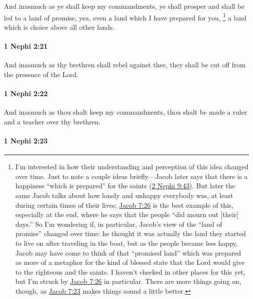 			And inasmuch as ye shall keep my commandments,
			ye shall prosper and shall be led to a land of promise,
			yea, even a land which I have prepared for you,%
				\footnote{%
					I'm interested in how their understanding and perception of this idea changed over time. Just to note a couple ideas briefly---Jacob later says that there is a happiness ``which is prepared'' for the saints (\hyperref[2NEPHI-9-43]{2 Nephi 9:43}). But later the same Jacob talks about how lonely and unhappy everybody was, at least during certain times of their lives; \hyperref[JACOB-7-26]{Jacob 7:26} is the best example of this, especially at the end, where he says that the people ``did mourn out [their] days.'' So I'm wondering if, in particular, Jacob's view of the ``land of promise'' changed over time: he thought it was actually the land they started to live on after traveling in the boat, but as the people became less happy, Jacob may have come to think of that ``promised land'' which was prepared as more of a metaphor for the kind of blessed state that the Lord would give to the righteous and the saints. I haven't checked in other places for this yet, but I'm struck by \hyperref[JACOB-7-26]{Jacob 7:26} in particular. There are more things going on, though, as \hyperref[ JACOB-7-23]{Jacob 7:23} makes things sound a little better.
					}
			a land which is choice above all other lands.

		\paragraph{1 Nephi 2:21} %
			\label{1NEPHI-2-21}

			And inasmuch as thy brethren shall rebel against thee,
			they shall be cut off from the presence of the Lord.

		\paragraph{1 Nephi 2:22} %
			\label{1NEPHI-2-22}

			And inasmuch as thou shalt keep my commandments,
			thou shalt be made a ruler and a teacher over thy brethren.

		\paragraph{1 Nephi 2:23} %
			\label{1NEPHI-2-23}

